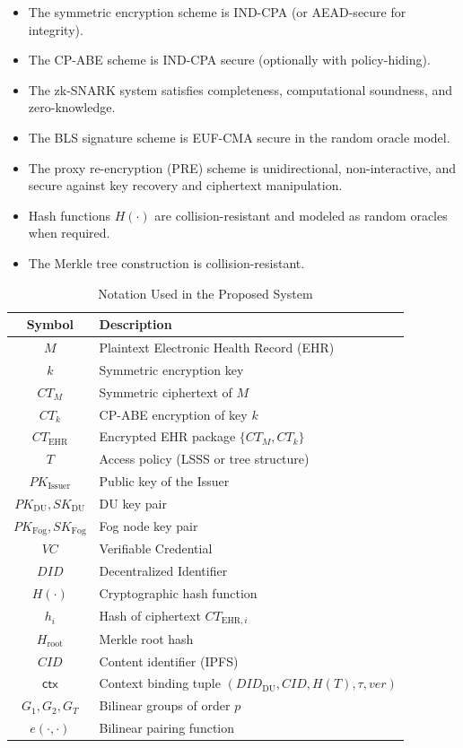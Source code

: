 \documentclass[conference]{IEEEtran}
\begin{document}
\begin{itemize}
    \item The symmetric encryption scheme is IND-CPA (or AEAD-secure for integrity).
    \item The CP-ABE scheme is IND-CPA secure (optionally with policy-hiding).
    \item The zk-SNARK system satisfies completeness, computational soundness, and zero-knowledge.
    \item The BLS signature scheme is EUF-CMA secure in the random oracle model.
    \item The proxy re-encryption (PRE) scheme is unidirectional, non-interactive, and secure against key recovery and ciphertext manipulation.
    \item Hash functions $H(\cdot)$ are collision-resistant and modeled as random oracles when required.
    \item The Merkle tree construction is collision-resistant.
\end{itemize}

\begin{table}[htbp]
\caption{Notation Used in the Proposed System}
\label{tab:notation}
\centering
\begin{tabular}{|c|l|}
\hline
\textbf{Symbol} & \textbf{Description} \\
\hline
$M$ & Plaintext Electronic Health Record (EHR) \\
$k$ & Symmetric encryption key \\
$CT_M$ & Symmetric ciphertext of $M$ \\
$CT_k$ & CP-ABE encryption of key $k$ \\
$CT_{\text{EHR}}$ & Encrypted EHR package $\{CT_M, CT_k\}$ \\
$T$ & Access policy (LSSS or tree structure) \\
$PK_{\text{Issuer}}$ & Public key of the Issuer \\
$PK_{\text{DU}}, SK_{\text{DU}}$ & DU key pair \\
$PK_{\text{Fog}}, SK_{\text{Fog}}$ & Fog node key pair \\
$VC$ & Verifiable Credential \\
$DID$ & Decentralized Identifier \\
$H(\cdot)$ & Cryptographic hash function \\
$h_i$ & Hash of ciphertext $CT_{\text{EHR},i}$ \\
$H_{\text{root}}$ & Merkle root hash \\
$CID$ & Content identifier (IPFS) \\
$\mathsf{ctx}$ & Context binding tuple $(DID_{\text{DU}}, CID, H(T), \tau, ver)$ \\
$G_1, G_2, G_T$ & Bilinear groups of order $p$ \\
$e(\cdot,\cdot)$ & Bilinear pairing function \\
\hline
\end{tabular}
\end{table}
\end{document}
